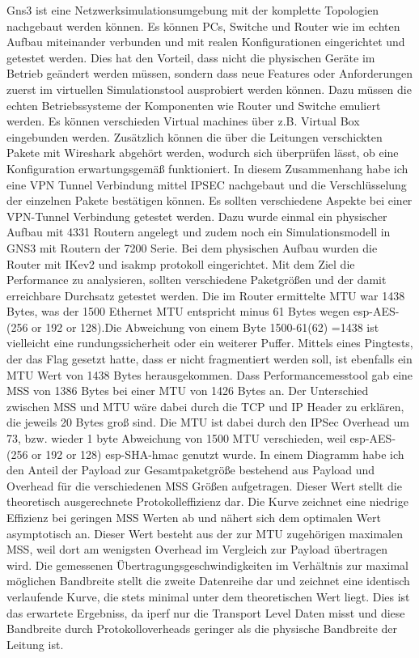 \documentclass[english,runningheads,a4paper]{llncs}[2018/03/10]
\begin{document}
Gns3 ist eine Netzwerksimulationsumgebung mit der komplette Topologien nachgebaut werden können. Es können PCs, Switche und Router wie im echten Aufbau miteinander verbunden und mit realen Konfigurationen eingerichtet und getestet werden. Dies hat den Vorteil, dass nicht die physischen Geräte im Betrieb geändert werden müssen, sondern dass neue Features oder Anforderungen zuerst im virtuellen Simulationstool ausprobiert werden können. Dazu müssen die echten Betriebssysteme der Komponenten wie Router und Switche emuliert werden. Es können verschieden Virtual machines über z.B. Virtual Box eingebunden werden. Zusätzlich können die über die Leitungen verschickten Pakete mit Wireshark abgehört werden, wodurch sich überprüfen lässt, ob eine Konfiguration erwartungsgemäß funktioniert. In diesem Zusammenhang habe ich eine VPN Tunnel Verbindung mittel IPSEC nachgebaut und die Verschlüsselung der einzelnen Pakete bestätigen können. Es sollten verschiedene Aspekte bei einer VPN-Tunnel Verbindung getestet werden. Dazu wurde einmal ein physischer Aufbau mit 4331 Routern angelegt und zudem noch ein Simulationsmodell in GNS3 mit Routern der 7200 Serie. Bei dem physischen Aufbau wurden die Router mit IKev2 und isakmp protokoll eingerichtet. Mit dem Ziel die Performance zu analysieren, sollten verschiedene Paketgrößen und der damit erreichbare Durchsatz getestet werden. Die im Router ermittelte MTU war 1438 Bytes, was der 1500 Ethernet MTU entspricht minus 61 Bytes wegen esp-AES-(256
or 192 or 128).Die Abweichung von einem Byte 1500-61(62) =1438 ist vielleicht eine rundungssicherheit oder ein weiterer Puffer. Mittels eines Pingtests, der das Flag gesetzt hatte, dass er nicht fragmentiert werden soll, ist ebenfalls ein MTU Wert von 1438 Bytes herausgekommen. Dass Performancemesstool  gab eine MSS von 1386 Bytes bei einer MTU von 1426 Bytes an. Der Unterschied zwischen MSS und MTU wäre dabei durch die TCP und IP Header zu erklären, die jeweils 20 Bytes groß sind. Die MTU ist dabei durch den IPSec Overhead um 73, bzw. wieder 1 byte Abweichung
von 1500 MTU verschieden, weil esp-AES-(256 or 192 or 128) esp-SHA-hmac
genutzt wurde. In einem Diagramm habe ich den Anteil der Payload zur Gesamtpaketgröße bestehend aus Payload und Overhead für die verschiedenen MSS Größen aufgetragen. Dieser Wert stellt die theoretisch ausgerechnete Protokolleffizienz dar. Die Kurve zeichnet eine niedrige Effizienz bei geringen MSS Werten ab und nähert sich dem optimalen Wert asymptotisch an. Dieser Wert besteht aus der zur MTU zugehörigen maximalen MSS, weil dort am wenigsten Overhead im Vergleich zur Payload übertragen wird. Die gemessenen Übertragungsgeschwindigkeiten im Verhältnis zur maximal möglichen Bandbreite stellt die zweite Datenreihe dar und zeichnet eine identisch verlaufende Kurve, die stets minimal unter dem theoretischen Wert liegt. Dies ist das erwartete Ergebniss, da iperf nur die Transport Level Daten misst und diese Bandbreite durch Protokolloverheads geringer als die physische Bandbreite der Leitung ist.
\end{document}
